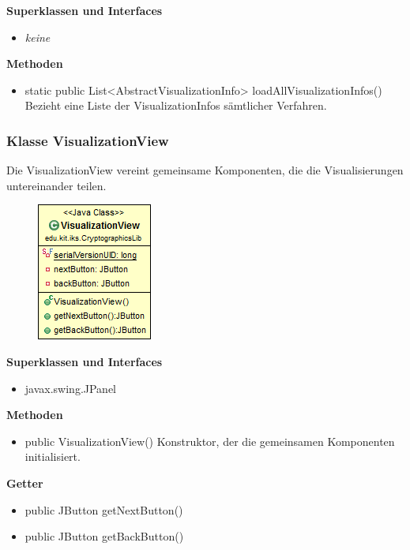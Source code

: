 \documentclass{article}
\begin{document}
      \textbf{Superklassen und Interfaces}
      \begin{itemize}
        \item \textit{keine}
      \end{itemize}
	
      \textbf{Methoden}
      \begin{itemize}
        \item static public List<AbstractVisualizationInfo> loadAllVisualizationInfos() \newline
          Bezieht eine Liste der VisualizationInfos sämtlicher Verfahren.
      \end{itemize}
	
	\subsubsection{Klasse VisualizationView}
	  Die VisualizationView vereint gemeinsame Komponenten, die die Visualisierungen
	  untereinander teilen.
	
      \begin{figure}[H]
        \centering
        \includegraphics{resources/edu-kit-iks-CryptographicsLib-VisualizationView}
      \end{figure}
	
      \textbf{Superklassen und Interfaces}
      \begin{itemize}
        \item javax.swing.JPanel
      \end{itemize}
	
      \textbf{Methoden}
      \begin{itemize}
        \item public VisualizationView() \newline
          Konstruktor, der die gemeinsamen Komponenten initialisiert.
      \end{itemize}
      
      \textbf{Getter}
      \begin{itemize}
		\item public JButton getNextButton()
		\item public JButton getBackButton()
      \end{itemize}
	
\end{document}
